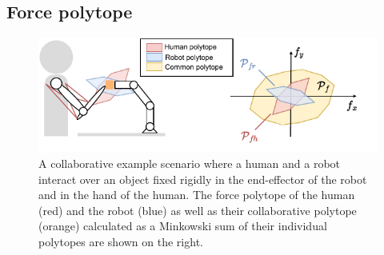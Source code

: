

\subsection{Force polytope}
\label{ch:force_collab}
\begin{figure}[!h]
    \centering
    \includegraphics[width=0.7\linewidth]{Chapters/imgs/force_collab.pdf}
    \caption{A collaborative example scenario where a human and a robot interact over an object fixed rigidly in the end-effector of the robot and in the hand of the human. The force polytope of the human (red) and the robot (blue) as well as their collaborative polytope (orange) calculated as a Minkowski sum of their individual polytopes are shown on the right.}
    \label{fig:collaboration_force}
\end{figure}

